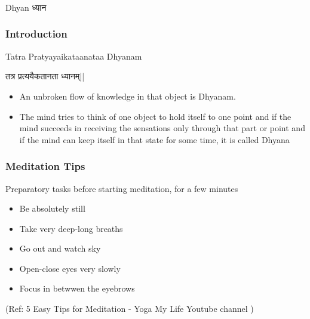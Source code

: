 \begin{frame}[fragile]\frametitle{}
\begin{center}
{\Large Dhyan ध्यान}
\end{center}
\end{frame}


\begin{frame}[fragile]\frametitle{Introduction}

Tatra Pratyayaikataanataa Dhyanam

तत्र प्रत्ययैकतानता ध्यानम्||

	\begin{itemize}
	\item An  unbroken  flow  of 
knowledge  in  that  object  is 
Dhyanam.  
\item The  mind  tries  to 
think  of  one  object  to  hold 
itself  to  one  point  and  if  the 
mind  succeeds  in  receiving 
the  sensations  only  through 
that  part  or  point    and  if  the 
mind  can  keep  itself  in  that 
state  for  some  time,  it  is 
called Dhyana
	\end{itemize}

\end{frame}


\begin{frame}[fragile]\frametitle{Meditation Tips}

Preparatory tasks before starting meditation, for a few minutes

	\begin{itemize}
	\item Be absolutely still
	\item Take very deep-long breaths
	\item Go out and watch sky
	\item Open-close eyes very slowly
	\item Focus in betwwen the eyebrows
	\end{itemize}

\tiny{(Ref: 5 Easy Tips for Meditation - Yoga My Life Youtube channel )}
\end{frame}

